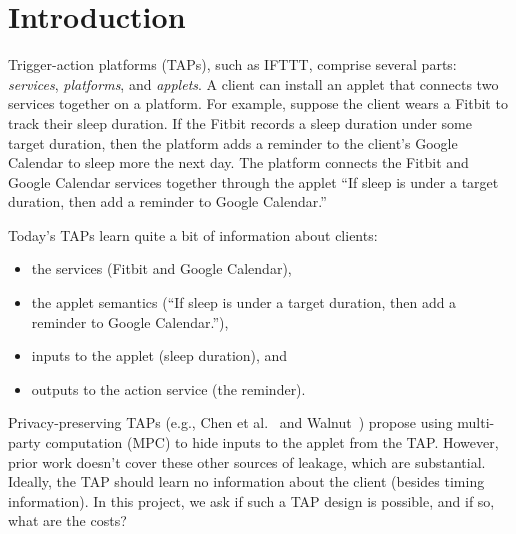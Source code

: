 \section{Introduction}
\label{sec:intro}

Trigger-action platforms (TAPs), such as IFTTT, comprise several parts:
\emph{services}, \emph{platforms}, and \emph{applets}. A client can install an
applet that connects two services together on a platform. For example, suppose
the client wears a Fitbit to track their sleep duration. If the Fitbit records a
sleep duration under some target duration, then the platform adds a reminder to
the client's Google Calendar to sleep more the next day. The platform connects
the Fitbit and Google Calendar services together through the applet ``If sleep
is under a target duration, then add a reminder to Google Calendar.'' 

Today's TAPs learn quite a bit of information about clients:
\begin{itemize}[leftmargin=*]
  \item the services (Fitbit and Google Calendar),
  \item the applet semantics (``If sleep is under a target duration, then add a
    reminder to Google Calendar.''),
  \item inputs to the applet (sleep duration), and
  \item outputs to the action service (the reminder).
\end{itemize}

Privacy-preserving TAPs (e.g., Chen et al.~\cite{DBLP:conf/sp/ChenCWSCF21} and
Walnut~\cite{DBLP:journals/corr/abs-2009-12447}) propose using multi-party
computation (MPC) to hide inputs to the applet from the TAP. However, prior work
doesn't cover these other sources of leakage, which are substantial. Ideally,
the TAP should learn no information about the client (besides timing
information). In this project, we ask if such a TAP design is possible, and if
so, what are the costs?
